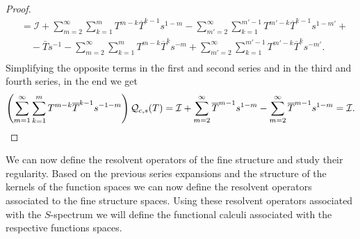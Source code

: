 \documentclass[reqno,11pt]{amsart}
\numberwithin{equation}{section}
\theoremstyle{definition}
\begin{document}
\begin{proof}
\[\begin{split}
		&=\mathcal{I}+\sum_{m=2}^\infty  \sum_{k=1}^m T^{m-k}\overline{T}^{k-1}s^{1-m}- \sum_{m'=2}^\infty  \sum_{k=1}^{m'-1} T^{m'-k}\overline T^{k-1}s^{1-m'} +\\
		&\, \, \, \, \, \,-\bar{T}s^{-1}- \sum_{m=2}^\infty \sum_{k=1}^m T^{m-k}\overline T^k s^{-m}+\sum_{m'=2}^\infty  \sum_{k=1}^{m'-1} T^{m'-k} \overline T^k s^{-m'}.\\
	\end{split}
	\]
	Simplifying the opposite terms in the first and second series and in the third and fourth series, in the end we get
	\[
	\left(\sum_{m=1}^\infty  \sum_{k=1}^m T^{m-k} \overline T^{k-1} s^{-1-m}\right)\mathcal Q_{c,s}(T)=\mathcal I+\sum_{m=2}^\infty\overline T^{m-1}s^{1-m}-\sum_{m=2}^\infty\overline T^{m-1}s^{1-m}=\mathcal I.\\
	\]
\end{proof}


We can now define the resolvent operators of the fine structure and study their regularity.
Based on the previous series expansions and the structure of the kernels of the function spaces
we can now define the resolvent operators associated to the fine structure spaces.
Using these resolvent operators associated with the $S$-spectrum we will define the functional calculi associated with the respective functions spaces.
\end{document}
